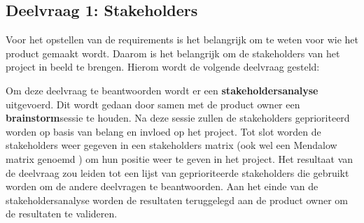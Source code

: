 \subsection{Deelvraag 1: Stakeholders}
Voor het opstellen van de requirements is het belangrijk om te weten voor wie het product gemaakt wordt.
Daarom is het belangrijk om de stakeholders van het project in beeld te brengen.
Hierom wordt de volgende deelvraag gesteld:

\begin{center}
	\textit{\SubquestionOne}
\end{center}

\whitespace[0.2]
Om deze deelvraag te beantwoorden wordt er een \textbf{stakeholdersanalyse} uitgevoerd.
Dit wordt gedaan door samen met de product owner een \textbf{brainstorm}sessie te houden.
Na deze sessie zullen de stakeholders geprioriteerd worden op basis van belang en invloed op het project.
Tot slot worden de stakeholders weer gegeven in een stakeholders matrix (ook wel een Mendalow matrix genoemd \Parencite{MandelowMatrix} ) om hun positie weer te geven in het project.
Het resultaat van de deelvraag zou leiden tot een lijst van geprioriteerde stakeholders die gebruikt worden om de andere deelvragen te beantwoorden.
Aan het einde van de stakeholdersanalyse worden de resultaten teruggelegd aan de product owner om de resultaten te valideren.
